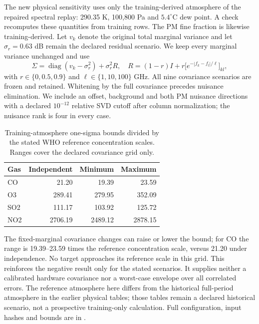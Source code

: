 \documentclass[conference]{IEEEtran}
\begin{document}
The new physical sensitivity uses only the training-derived atmosphere of the repaired spectral replay: 290.35 K, 100,800 Pa and $5.4^\circ$C dew point. A check recomputes these quantities from training rows. The PM fine fraction is likewise training-derived. Let $v_k$ denote the original total marginal variance and let $\sigma_r=0.63$ dB remain the declared residual scenario. We keep every marginal variance unchanged and use
\[
\Sigma=\operatorname{diag}(v_k-\sigma_r^2)+\sigma_r^2R,
\quad R=(1-r)I+r\big[e^{-|f_k-f_l|/\ell}\big]_{kl},
\]
with $r\in\{0,0.5,0.9\}$ and $\ell\in\{1,10,100\}$ GHz. All nine covariance scenarios are frozen and retained. Whitening by the full covariance precedes nuisance elimination. We include an offset, background and both PM nuisance directions with a declared $10^{-12}$ relative SVD cutoff after column normalization; the nuisance rank is four in every case.

\begin{table}[t]\centering\small
\caption{Training-atmosphere one-sigma bounds divided by the stated WHO reference concentration scales. Ranges cover the declared covariance grid only.}
\begin{tabular}{lrrr}\toprule
Gas & Independent & Minimum & Maximum\\\midrule
CO & 21.20 & 19.39 & 23.59\\
O3 & 289.41 & 279.95 & 352.09\\
SO2 & 111.17 & 103.92 & 125.72\\
NO2 & 2706.19 & 2489.12 & 2878.15\\
\bottomrule\end{tabular}\end{table}

The fixed-marginal covariance changes can raise or lower the bound; for CO the range is 19.39--23.59 times the reference concentration scale, versus 21.20 under independence. No target approaches its reference scale in this grid. This reinforces the negative result only for the stated scenarios. It supplies neither a calibrated hardware covariance nor a worst-case envelope over all correlated errors. The reference atmosphere here differs from the historical full-period atmosphere in the earlier physical tables; those tables remain a declared historical scenario, not a prospective training-only calculation. Full configuration, input hashes and bounds are in .
\end{document}
